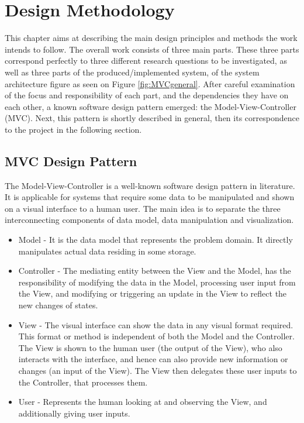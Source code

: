 \chapter{Design Methodology}

This chapter aims at describing the main design principles and methods the work intends to follow. The overall work consists of three main parts. These three parts correspond perfectly to three different research questions to be investigated, as well as three parts of the produced/implemented system, of the system architecture figure as seen on Figure \ref{fig:MVCgeneral}. After careful examination of the focus and responsibility of each part, and the dependencies they have on each other, a known software design pattern emerged: the Model-View-Controller (MVC). Next, this pattern is shortly described in general, then its correspondence to the project in the following section. 

\section{MVC Design Pattern}
The Model-View-Controller is a well-known software design pattern in literature. It is applicable for systems that require some data to be manipulated and shown on a visual interface to a human user. The main idea is to separate the three interconnecting components of data model, data manipulation and visualization.
\begin{itemize}
\item Model - It is the data model that represents the problem domain. It directly manipulates actual data residing in some storage. 
\item Controller - The mediating entity between the View and the Model, has the responsibility of modifying the data in the Model, processing user input from the View, and modifying or triggering an update in the View to reflect the new changes of states.
\item View - The visual interface can show the data in any visual format required. This format or method is independent of both the Model and the Controller. The View is shown to the human user (the output of the View), who also interacts with the interface, and hence can also provide new information or changes (an input of the View). The View then delegates these user inputs to the Controller, that processes them. 
\item User - Represents the human looking at and observing the View, and additionally giving user inputs.

\end{itemize}


  
  
  
  